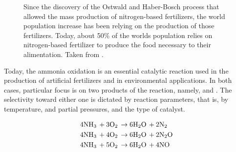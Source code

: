 \begin{figure}
\centering
    \caption{
    Since the discovery of the Ostwald and Haber-Bosch process that allowed the mass production of nitrogen-based fertilizers, the world population increase has been relying on the production of those fertilizers.
    Today, about 50\% of the worlds population relies on nitrogen-based fertilizer to produce the food necessary to their alimentation.
    Taken from \cite{WorldDataFertilizer}.
    }
    \label{fig:FertilizerWID}
\end{figure}

Today, the ammonia oxidation is an essential catalytic reaction used in the production of artificial fertilizers and in environmental applications.
In both cases, particular focus is on two products of the reaction, namely, \nitricoxide and \nitrogen.
The selectivity toward either one is dictated by reaction parameters, that is, by temperature, \ammonia and \dioxygen partial pressures, and the type of catalyst.

\begin{align}
    \label{eq:AmmoniaOxidation1}
    4 \ammonia + 3 \dioxygen & \rightarrow 6 \water + 2 \nitrogen \\
    \label{eq:AmmoniaOxidation2}
    4 \ammonia + 4 \dioxygen & \rightarrow 6 \water + 2 \nitrousoxide \\
    \label{eq:AmmoniaOxidation3}
    4 \ammonia + 5 \dioxygen & \rightarrow 6 \water + 4 \nitricoxide
\end{align}


